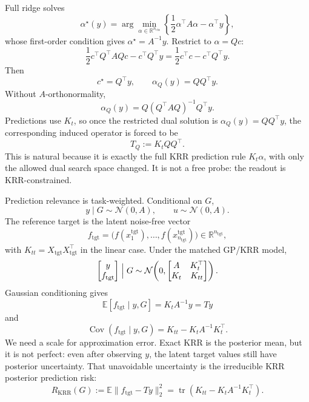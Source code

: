 \documentclass[11pt]{article}
\newcommand{\R}{\mathbb{R}}
\begin{document}
Full ridge solves
\[
\alpha^\star(y)
=
\arg\min_{\alpha\in\R^{n_{\mathrm{ctx}}}}
\left\{
\frac12\alpha^\top A\alpha-\alpha^\top y
\right\},
\]
whose first-order condition gives \(\alpha^\star=A^{-1}y\). Restrict to
\(\alpha=Qc\):
\[
\frac12 c^\top Q^\top A Qc-c^\top Q^\top y
=
\frac12 c^\top c-c^\top Q^\top y.
\]
Then
\[
c^\star=Q^\top y,
\qquad
\alpha_Q(y)=QQ^\top y.
\]
Without \(A\)-orthonormality,
\[
\alpha_Q(y)=Q(Q^\top A Q)^{-1}Q^\top y.
\]
Predictions use \(K_t\), so once the restricted dual solution is \(\alpha_Q(y)=QQ^\top y\), the
corresponding induced operator is forced to be
\[
T_Q:=K_tQQ^\top.
\]
This is natural because it is exactly the full KRR prediction rule \(K_t\alpha\), with only the
allowed dual search space changed. It is not a free probe: the readout is KRR-constrained.

Prediction relevance is task-weighted. Conditional on \(G\),
\[
y\mid G\sim\mathcal{N}(0,A),
\qquad
u\sim\mathcal{N}(0,A).
\]
The reference target is the latent noise-free vector
\[
f_{\mathrm{tgt}}
=
\bigl(f(x^{\mathrm{tgt}}_1),\ldots,f(x^{\mathrm{tgt}}_{n_{\mathrm{tgt}}})\bigr)
\in\R^{n_{\mathrm{tgt}}},
\]
with \(K_{tt}=X_{\mathrm{tgt}}X_{\mathrm{tgt}}^\top\) in the linear case. Under the matched GP/KRR
model,
\[
\begin{bmatrix}
y\\
f_{\mathrm{tgt}}
\end{bmatrix}
\Bigm|G
\sim
\mathcal{N}\!\left(
0,
\begin{bmatrix}
A & K_t^\top\\
K_t & K_{tt}
\end{bmatrix}
\right).
\]
Gaussian conditioning gives
\[
\mathbb{E}[f_{\mathrm{tgt}}\mid y,G]=K_tA^{-1}y=Ty
\]
and
\[
\operatorname{Cov}(f_{\mathrm{tgt}}\mid y,G)
=
K_{tt}-K_tA^{-1}K_t^\top .
\]
We need a scale for approximation error. Exact KRR is the posterior mean, but it is not perfect:
even after observing \(y\), the latent target values still have posterior uncertainty. That
unavoidable uncertainty is the irreducible KRR posterior prediction risk:
\[
R_{\mathrm{KRR}}(G)
:=
\mathbb{E}\|f_{\mathrm{tgt}}-Ty\|_2^2
=
\operatorname{tr}\!\left(K_{tt}-K_tA^{-1}K_t^\top\right).
\]
\end{document}
